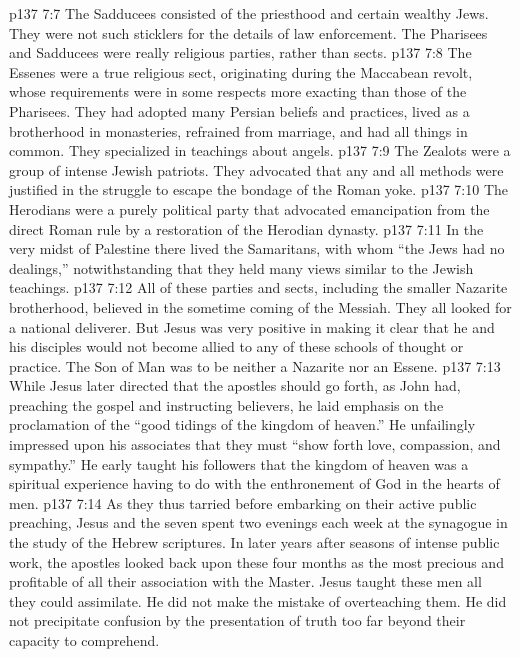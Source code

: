 \pc \vs p137 7:7 The Sadducees consisted of the priesthood and certain wealthy Jews. They were not such sticklers for the details of law enforcement. The Pharisees and Sadducees were really religious parties, rather than sects.
\pc \vs p137 7:8 The Essenes were a true religious sect, originating during the Maccabean revolt, whose requirements were in some respects more exacting than those of the Pharisees. They had adopted many Persian beliefs and practices, lived as a brotherhood in monasteries, refrained from marriage, and had all things in common. They specialized in teachings about angels.
\pc \vs p137 7:9 The Zealots were a group of intense Jewish patriots. They advocated that any and all methods were justified in the struggle to escape the bondage of the Roman yoke.
\pc \vs p137 7:10 The Herodians were a purely political party that advocated emancipation from the direct Roman rule by a restoration of the Herodian dynasty.
\pc \vs p137 7:11 In the very midst of Palestine there lived the Samaritans, with whom “the Jews had no dealings,” notwithstanding that they held many views similar to the Jewish teachings.
\pc \vs p137 7:12 All of these parties and sects, including the smaller Nazarite brotherhood, believed in the sometime coming of the Messiah. They all looked for a national deliverer. But Jesus was very positive in making it clear that he and his disciples would not become allied to any of these schools of thought or practice. The Son of Man was to be neither a Nazarite nor an Essene.
\vs p137 7:13 While Jesus later directed that the apostles should go forth, as John had, preaching the gospel and instructing believers, he laid emphasis on the proclamation of the \textcolor{ubdarkred}{“good tidings of the kingdom of heaven.”} He unfailingly impressed upon his associates that they must \textcolor{ubdarkred}{“show forth love, compassion, and sympathy.”} He early taught his followers that the kingdom of heaven was a spiritual experience having to do with the enthronement of God in the hearts of men.
\vs p137 7:14 As they thus tarried before embarking on their active public preaching, Jesus and the seven spent two evenings each week at the synagogue in the study of the Hebrew scriptures. In later years after seasons of intense public work, the apostles looked back upon these four months as the most precious and profitable of all their association with the Master. Jesus taught these men all they could assimilate. He did not make the mistake of overteaching them. He did not precipitate confusion by the presentation of truth too far beyond their capacity to comprehend.\plusone
